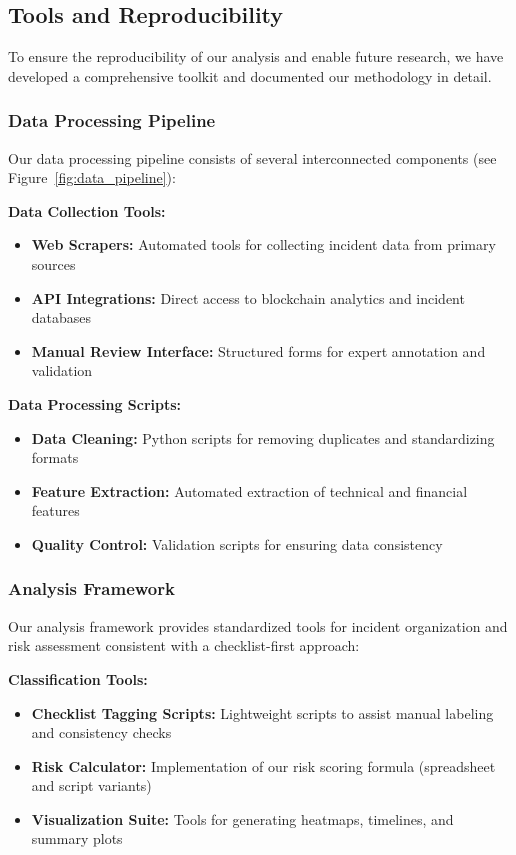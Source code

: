 \subsection{Tools and Reproducibility}
\label{sec:tools_and_reproducibility}

To ensure the reproducibility of our analysis and enable future research, we have developed a comprehensive toolkit and documented our methodology in detail.

\subsubsection{Data Processing Pipeline}
Our data processing pipeline consists of several interconnected components (see Figure~\ref{fig:data_pipeline}):

\textbf{Data Collection Tools:}
\begin{itemize}
    \item \textbf{Web Scrapers:} Automated tools for collecting incident data from primary sources
    \item \textbf{API Integrations:} Direct access to blockchain analytics and incident databases
    \item \textbf{Manual Review Interface:} Structured forms for expert annotation and validation
\end{itemize}

\textbf{Data Processing Scripts:}
\begin{itemize}
    \item \textbf{Data Cleaning:} Python scripts for removing duplicates and standardizing formats
    \item \textbf{Feature Extraction:} Automated extraction of technical and financial features
    \item \textbf{Quality Control:} Validation scripts for ensuring data consistency
\end{itemize}

\subsubsection{Analysis Framework}
Our analysis framework provides standardized tools for incident organization and risk assessment consistent with a checklist-first approach:

\textbf{Classification Tools:}
\begin{itemize}
    \item \textbf{Checklist Tagging Scripts:} Lightweight scripts to assist manual labeling and consistency checks
    \item \textbf{Risk Calculator:} Implementation of our risk scoring formula (spreadsheet and script variants)
    \item \textbf{Visualization Suite:} Tools for generating heatmaps, timelines, and summary plots
\end{itemize}

